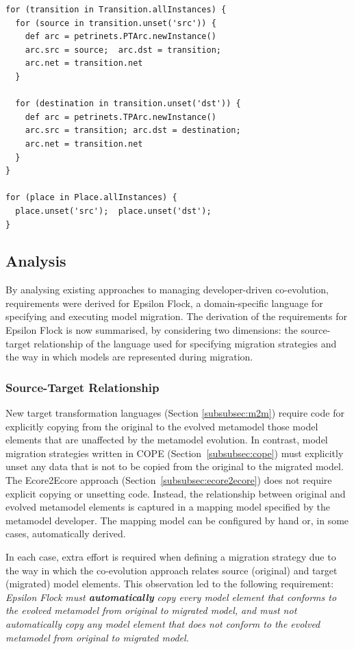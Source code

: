 \begin{lstlisting}[caption=Petri nets model migration in COPE, label=lst:cope, language=COPE]
for (transition in Transition.allInstances) {
  for (source in transition.unset('src')) {
    def arc = petrinets.PTArc.newInstance()
    arc.src = source;  arc.dst = transition;
    arc.net = transition.net
  }

  for (destination in transition.unset('dst')) {
    def arc = petrinets.TPArc.newInstance() 
    arc.src = transition; arc.dst = destination;
    arc.net = transition.net
  }
}

for (place in Place.allInstances) {
  place.unset('src');  place.unset('dst');
}
\end{lstlisting}


\subsection{Analysis}
\label{subsec:analysis}
By analysing existing approaches to managing developer-driven co-evolution, requirements were derived for Epsilon Flock, a domain-specific language for specifying and executing model migration. The derivation of the requirements for Epsilon Flock is now summarised, by considering two dimensions: the source-target relationship of the language used for specifying migration strategies and the way in which models are represented during migration. %


\subsubsection{Source-Target Relationship}
New target transformation languages (Section \ref{subsubsec:m2m}) require code for explicitly copying from the original to the evolved metamodel those model elements that are unaffected by the metamodel evolution. In contrast, model migration strategies written in COPE (Section~\ref{subsubsec:cope}) must explicitly unset any data that is not to be copied from the original to the migrated model. The Ecore2Ecore approach (Section~\ref{subsubsec:ecore2ecore}) does not require explicit copying or unsetting code. Instead, the relationship between original and evolved metamodel elements is captured in a mapping model specified by the metamodel developer. The mapping model can be configured by hand or, in some cases, automatically derived. 

In each case, extra effort is required when defining a migration strategy due to the way in which the co-evolution approach relates source (original) and target (migrated) model elements. This observation led to the following requirement: \emph{Epsilon Flock must \textbf{automatically} copy every model element that conforms to the evolved metamodel from original to migrated model, and must not automatically copy any model element that does not conform to the evolved metamodel from original to migrated model.}



